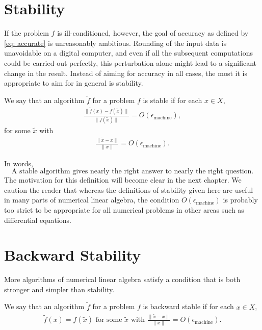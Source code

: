 \section{Stability} 
If the problem $f$ is ill-conditioned, however, the goal of accuracy as defined by \autoref{eq: accurate} is unreasonably ambitious. Rounding of the input data is unavoidable on a digital computer, and even if all the subsequent computations could be carried out perfectly, this perturbation alone might lead to a significant change in the result. Instead of aiming for accuracy in all cases, the most it is appropriate to aim for in general is stability.


\begin{definition}
[Stability]
\label{def: Stability}
 We say that an algorithm $\tilde{f}$ for a problem $f$ is stable if for each $x \in X$,
\begin{align}
    \label{eq: stab err}
\frac{\|\tilde{f}(x)-f(\tilde{x})\|}{\|f(\tilde{x})\|}=O\left(\epsilon_{\text {machine}}\right),
\end{align}
for some $\tilde{x}$ with
\begin{align}
    \label{eq: stab input}
\frac{\|\tilde{x}-x\|}{\|x\|}=O\left(\epsilon_{\text {machine}}\right).
\end{align}
\end{definition}
In words,
\[
  \text{A stable algorithm gives nearly the right answer to nearly the right question.}  
\]
The motivation for this definition will become clear in the next chapter. We caution the reader that whereas the definitions of stability given here are useful in many parts of numerical linear algebra, the condition $O\left(\epsilon_{\text {machine}}\right)$ is probably too strict to be appropriate for all numerical problems in other areas such as differential equations.

\section{Backward Stability} 
More algorithms of numerical linear algebra satisfy a condition that is both stronger and simpler than stability. 


\begin{definition}
\label{def: Backward stable}
We say that an algorithm $\tilde{f}$ for a problem $f$ is backward stable if for each $x \in X$,
\begin{align}
\label{eq: backstab}
\tilde{f}(x)=f(\tilde{x}) \text { for some } \tilde{x} \text { with } \frac{\|\tilde{x}-x\|}{\|x\|}=O\left(\epsilon_{\text {machine}}\right). 
\end{align}
\end{definition}

